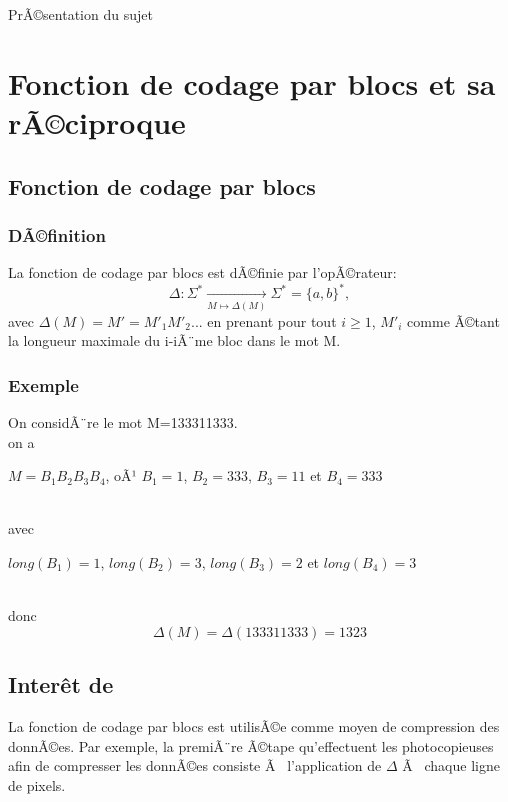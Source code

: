 \documentclass[12pt,a4paper,oneside]{book}
\begin{document}
\begin{titlepage}
\begin{chapter}{PrÃ©sentation du sujet}
\section{Fonction de codage par blocs et sa rÃ©ciproque}
\subsection{Fonction de codage par blocs}
\subsubsection*{DÃ©finition}
\par La fonction de codage par blocs est dÃ©finie par l'opÃ©rateur: 
 \[ \Delta: \Sigma^* \underset{M \longmapsto \Delta (M)}{\longrightarrow} \Sigma^*=\{a,b\}^*, \]
avec $\Delta(M) = M' = M'_1 M'_2 ... $ en prenant pour tout $ i \geq 1$, ${M'}_i$ comme Ã©tant la longueur maximale du i-iÃ¨me bloc dans le mot M.
\subsubsection*{Exemple}
On considÃ¨re le mot M=133311333.\\
on a
 \begin{center}
$M=B_1B_2B_3B_4$,\hspace{0,5\baselineskip} oÃ¹ $B_1=1$,\hspace{0,5\baselineskip} $B_2=333$,\hspace{0,5\baselineskip} $ B_3=11$ \hspace{0,5\baselineskip}et \hspace{0,5\baselineskip}$B_4=333$
\end{center}\\ 
avec 
\begin{center}
$long(B_1)=1$,\hspace{0,5\baselineskip} $long(B_2)=3$,\hspace{0,5\baselineskip} $long(B_3)=2$ \hspace{0,5\baselineskip} et \hspace{0,5\baselineskip} $long(B_4)=3$
\end{center}
  \\donc
 $$\Delta(M)=\Delta(133311333)=1323$$
\subsection{Inter\^et de \Delta}
\par La fonction de codage par blocs est utilisÃ©e  comme moyen de compression des donnÃ©es. Par exemple, la premiÃ¨re Ã©tape qu'effectuent les photocopieuses afin de compresser les donnÃ©es consiste Ã  l'application de $\Delta$ Ã  chaque ligne de pixels.

\end{chapter}
\end{titlepage}
\end{document}
